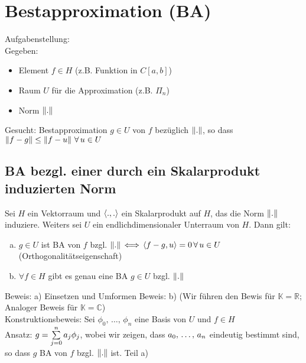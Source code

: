 \section{Bestapproximation (BA)}
Aufgabenstellung:\\
Gegeben:
\begin{itemize}
  \item Element $f \in H$ (z.B. Funktion in $C[a,b]$)
  \item Raum $U$ für die Approximation (z.B. $\Pi_n$)
  \item Norm $\left\lVert . \right\rVert$
\end{itemize}
Gesucht:
Bestapproximation $g \in U$ von $f$ bezüglich $\left\lVert . \right\rVert$, so dass 
$\left\lVert f - g \right\rVert \leq \left\lVert f - u \right\rVert\,\forall\,u \in U$

\subsection{BA bezgl. einer durch ein Skalarprodukt induzierten Norm}
 Sei $H$ ein Vektorraum und $\left\langle ., . \right\rangle$ ein Skalarprodukt auf $H$, das die
Norm $\left\lVert . \right\rVert$ induziere. Weiters sei $U$ ein endlichdimensionaler Unterraum von $H$.
Dann gilt:
\begin{enumerate}[(a)]
  \item $g \in U$ ist BA von $f$ bzgl. 
    $\left\lVert . \right\rVert\,\Longleftrightarrow\,\left\langle f - g, u \right\rangle = 0\,\forall\,u \in U$
    (Orthogonalitätseigenschaft)
  \item $\forall f \in H$ gibt es genau eine BA $g \in U$ bzgl. $\left\lVert . \right\rVert$
\end{enumerate}
Beweis: a) Einsetzen und Umformen
Beweis: b) (Wir führen den Bewis für $\mathbb{K} = \mathbb{R}$;
Analoger Beweis für $\mathbb{K} = \mathbb{C}$)\\
Konstruktionsbeweis: Sei ${\phi_0,\,\ldots,\,\phi_n}$ eine Basis von $U$ und $f \in H$\\
Ansatz: $g = \sum\limits_{j=0}^{n}{a_j \phi_j}$, wobei wir zeigen, dass $a_0,\,\ldots,\,a_n$
eindeutig bestimmt sind, so dass $g$ BA von $f$ bzgl. $\left\lVert . \right\rVert$ ist.
Teil a)
